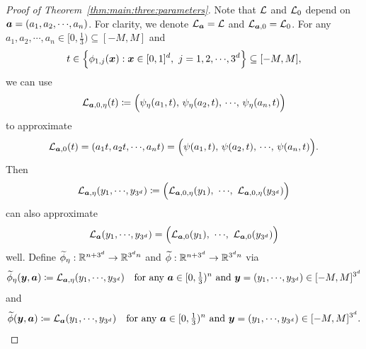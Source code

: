 \documentclass[nohyperref]{article}
\theoremstyle{plain}
\theoremstyle{definition}
\theoremstyle{remark}
\begin{document}
\begin{proof}[Proof of Theorem~\ref{thm:main:three:parameters}]
	Note that ${\mathcal{L}}$ and ${\mathcal{L}}_0$ depend on $\bma=(a_1,a_2,\cdots,a_n)$. For clarity, we denote ${\mathcal{L}}_{\bm{a}}={\mathcal{L}}$ and ${\mathcal{L}}_{{\bm{a}},0}={\mathcal{L}}_0$.
	For any  $a_1,a_2,\cdots,a_n\in [0,\tfrac{1}{3})\subseteq [-M,M]$ and \begin{equation*}
		t\in \Big\{\phi_{1,j}(\bmx): \bmx\in [0,1]^d,\   j=1,2,\cdots,3^d\Big\}\subseteq [-M,M],
	\end{equation*}
	we can use 
	\begin{equation*}
		\calL_{\bma,0,\eta}(t)\coloneqq\Big(\psi_{\eta}(a_1,t),\, \psi_{\eta}(a_2, t),\,\cdots,\,\psi_{\eta}(a_n, t)\Big)
	\end{equation*}
	to approximate 
	\begin{equation*}
		\calL_{\bma,0}(t)=(a_1t, a_2 t,\cdots,a_n t)=\Big(\psi(a_1,t),\, \psi(a_2, t),\,\cdots,\,\psi(a_n, t)\Big).
	\end{equation*}
	Then 
	\begin{equation*}
		\calL_{\bma,\eta}(y_1,\cdots,y_{3^d})\coloneqq \Big(\calL_{\bma,0,\eta}(y_1),\ \cdots,\ \calL_{\bma,0,\eta}(y_{3^d})\Big)
	\end{equation*}
	can also approximate 
	\begin{equation*}
		\calL_{\bma}(y_1,\cdots,y_{3^d})= \Big(\calL_{\bma,0}(y_1),\  \cdots,\ \calL_{\bma,0}(y_{3^d})\Big)
	\end{equation*}
	well. Define $\tildephi_\eta:\R^{n+3^d}\to\R^{3^dn}$ and $\tildephi:\R^{n+3^d}\to\R^{3^dn}$ via
	\begin{equation*}
		\tildephi_\eta(\bmy,\bma)\coloneqq \calL_{\bma,\eta}(y_1,\cdots,y_{3^d})\quad \tn{for any $\bma\in [0,\tfrac13)^n$ and $\bmy=(y_1,\cdots,y_{3^d}) \in [-M,M]^{3^d}$}
	\end{equation*}
	and 
	\begin{equation*}
		\tildephi(\bmy,\bma)\coloneqq \calL_{\bma}(y_1,\cdots,y_{3^d})\quad \tn{for any $\bma\in [0,\tfrac13)^n$ and $\bmy=(y_1,\cdots,y_{3^d})\in [-M,M]^{3^d}$}.
	\end{equation*}
	

\end{proof}
\end{document}
